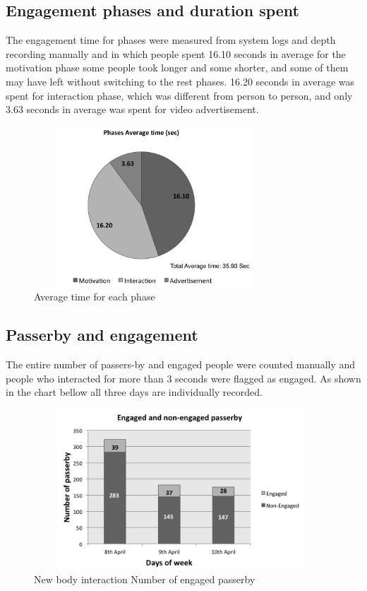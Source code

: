 \subsection{Engagement phases and duration spent}

The engagement time for phases were measured from system logs and depth recording manually and in which people spent 16.10 seconds in average for the motivation phase some people took longer and some shorter, and some of them may have left without switching to the rest phases. 16.20 seconds in average was spent for interaction phase, which was different from person to person, and only 3.63 seconds in average was spent for video advertisement.

\begin{figure}[H]
    \centering
    \includegraphics[width=90mm,height=60mm]{Figures/9/avg_phases}
    \caption{Average time for each phase}%
    \label{fig:newbodyaveragephases}%
\end{figure}



\subsection{Passerby and engagement}

The entire number of passers-by and engaged people were counted manually and people who interacted for more than 3 seconds were flagged as engaged. As shown in the chart bellow all three days are individually recorded. 

\begin{figure}[H]
    \centering
    \includegraphics[width=110mm,height=60mm]{Figures/9/newbody_inter_engage_day}
    \caption{New body interaction Number of engaged passerby}%
    \label{fig:newbodyengagedandengagedby}%
\end{figure}


